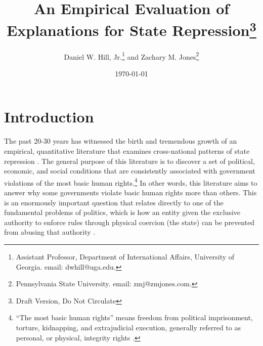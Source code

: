 \documentclass[12pt]{article}
\begin{document}
\vspace{50mm}
\date{\today}
\title{An Empirical Evaluation of Explanations for State Repression\thanks{Draft Version, Do Not Circulate}}
\bigskip
\author{Daniel W. Hill, Jr.\thanks{Assistant Professor, Department of International Affairs,
University of Georgia. email: dwhill@uga.edu.} and Zachary M. Jones\thanks{Pennsylvania State University. email: zmj@zmjones.com.}}

\maketitle \thispagestyle{empty}

\clearpage
\onehalfspace

\section{Introduction}

The past 20-30 years has witnessed the birth and tremendous growth of an empirical, quantitative literature that examines cross-national patterns of state repression \citep[See, e.g.,][]{Stohletal1986, Park1987, McCormickMitchell1988, Henderson1991, Henderson1993, PoeTate1994, Davenport1995, Fein1995, Davenport1999, CingranelliRichards1999isq, Keith1999, Poeetal1999, Apodaca2001, RichardsGellenySacko2001,  Hathaway2002, Keith2002PRQ, DavenportArmstrong2004, BDMetal2005, HafnerBurton2005jpr, HafnerBurtonTsutsui2005, Davenport2007AR, Davenport2007, KeithTatePoe2009, CingranelliFilippov2010}. The general purpose of this literature is to discover a set of political, economic, and social conditions that are consistently associated with government violations of the most basic human rights.\footnote{``The most basic human rights'' means freedom from political imprisonment, torture, kidnapping, and extrajudicial execution, generally referred to as personal, or physical, integrity rights \citep[See, e.g.][]{PoeTate1994, CingranelliRichards1999isq}.} In other words, this literature aims to answer why some governments violate basic human rights more than others. This is an enormously important question that relates directly to one of the fundamental problems of politics, which is how an entity given the exclusive authority to enforce rules through physical coercion (the state) can be prevented from abusing that authority \citep[See, e.g.,][]{Moore2010}. 
\end{document}
